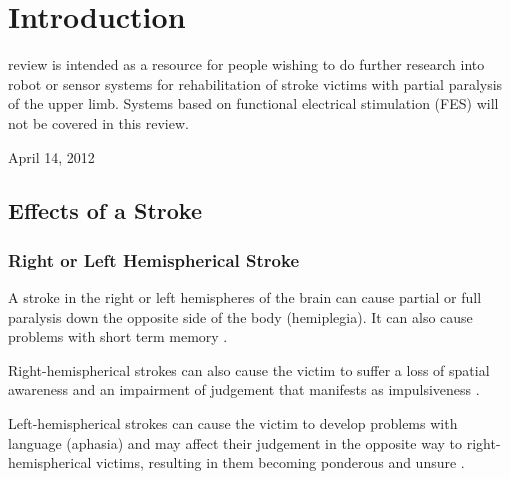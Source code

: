 \documentclass[journal]{IEEEtran}
\begin{document}
%



\section{Introduction}
% 
% 
% 
% 
 review is intended as a resource for people wishing 
to do further research into robot or sensor systems for rehabilitation of 
stroke victims with partial paralysis of the upper limb. Systems based on functional electrical 
stimulation (FES) will not be covered in this review.
 
\hfill April 14, 2012

\subsection{Effects of a Stroke}
\subsubsection{Right or Left Hemispherical Stroke}
A stroke in the right or left hemispheres of the brain can cause partial 
or full paralysis down the opposite side of the body (hemiplegia). It can 
also cause problems with short term memory \cite{NSA}.

Right-hemispherical strokes can also cause the victim to suffer a loss 
of spatial awareness and an impairment of judgement that manifests as 
impulsiveness \cite{NSA}.

Left-hemispherical strokes can cause the victim to develop problems with 
language (aphasia) and may affect their judgement in the opposite way to 
right-hemispherical victims, resulting in them becoming ponderous and unsure \cite{NSA}.
\end{document}
